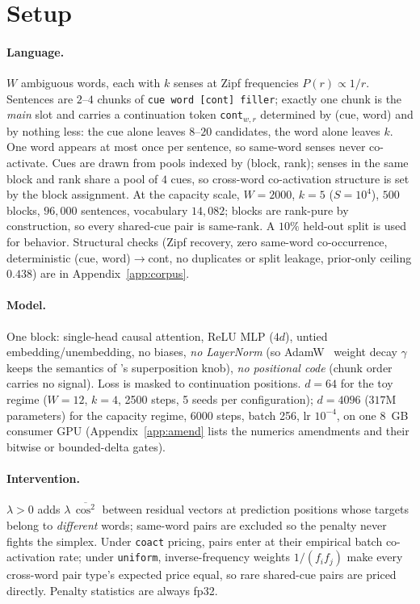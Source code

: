 \documentclass{article}
\begin{document}
\section{Setup}\label{sec:setup}

\paragraph{Language.} $W$ ambiguous words, each with $k$ senses at Zipf frequencies
$P(r)\propto 1/r$. Sentences are $2$--$4$ chunks of \texttt{cue word [cont] filler};
exactly one chunk is the \emph{main} slot and carries a continuation token
\texttt{cont}$_{w,r}$ determined by (cue, word) and by nothing less: the cue alone leaves
$8$--$20$ candidates, the word alone leaves $k$. One word appears at most once per
sentence, so same-word senses never co-activate. Cues are drawn from pools indexed by
(block, rank); senses in the same block and rank share a pool of $4$ cues, so cross-word
co-activation structure is set by the block assignment. At the capacity scale,
$W{=}2000$, $k{=}5$ ($S{=}10^4$), $500$ blocks, $96{,}000$ sentences, vocabulary
$14{,}082$; blocks are rank-pure by construction, so every shared-cue pair is same-rank.
A $10\%$ held-out split is used for behavior. Structural checks (Zipf recovery, zero
  same-word co-occurrence, deterministic (cue, word)$\to$cont, no duplicates or split
leakage, prior-only ceiling $0.438$) are in Appendix~\ref{app:corpus}.

\paragraph{Model.} One block: single-head causal attention, ReLU MLP ($4d$), untied
embedding/unembedding, no biases, \emph{no LayerNorm} (so AdamW~\citep{loshchilov2019decoupled}
  weight decay $\gamma$ keeps the semantics of \citet{liu2025superposition}'s superposition
knob), \emph{no
positional code} (chunk order carries no signal). Loss is masked to continuation
positions. $d{=}64$ for the toy regime ($W{=}12$, $k{=}4$, 2500 steps, 5 seeds per
configuration); $d{=}4096$ ($317$M parameters) for the capacity regime, 6000 steps, batch
256, lr $10^{-4}$, on one 8~GB consumer GPU (Appendix~\ref{app:amend} lists the numerics
amendments and their bitwise or bounded-delta gates).

\paragraph{Intervention.} $\lambda>0$ adds $\lambda\,\overline{\cos^2}$ between residual
vectors at prediction positions whose targets belong to \emph{different} words; same-word
pairs are excluded so the penalty never fights the simplex. Under \texttt{coact} pricing,
pairs enter at their empirical batch co-activation rate; under \texttt{uniform},
inverse-frequency weights $1/(f_if_j)$ make every cross-word pair type's expected price
equal, so rare shared-cue pairs are priced directly. Penalty statistics are always fp32.
\end{document}
